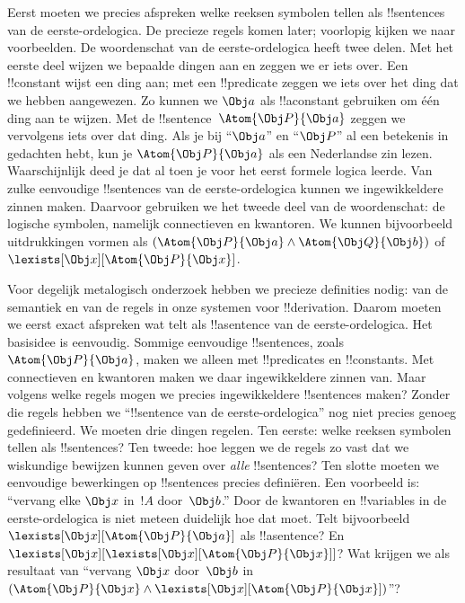 \documentclass[../../../include/open-logic-section]{subfiles}
\begin{document}


Eerst moeten we precies afspreken welke reeksen symbolen tellen als
!!{sentence}s van de eerste-ordelogica. De precieze regels komen later;
voorlopig kijken we naar voorbeelden. De woordenschat van de
eerste-ordelogica heeft twee delen. Met het eerste deel wijzen we
bepaalde dingen aan en zeggen we er iets over. Een !!{constant} wijst
een ding aan; met een !!{predicate} zeggen we iets over het ding dat
we hebben aangewezen. Zo kunnen we $\Obj a$ als !!a{constant} gebruiken
om één ding aan te wijzen. Met de !!{sentence}~$\Atom{\Obj P}{\Obj a}$
zeggen we vervolgens iets over dat ding. Als je bij ``$\Obj a$'' en
``$\Obj P$'' al een betekenis in gedachten hebt, kun je
$\Atom{\Obj P}{\Obj a}$ als een Nederlandse zin lezen. Waarschijnlijk
deed je dat al toen je voor het eerst formele logica leerde. Van zulke
eenvoudige !!{sentence}s van de eerste-ordelogica kunnen we
ingewikkeldere zinnen maken. Daarvoor gebruiken we het tweede deel van
de woordenschat: de logische symbolen, namelijk connectieven en
kwantoren. We kunnen bijvoorbeeld uitdrukkingen vormen als
$(\Atom{\Obj P}{\Obj a} \land \Atom{\Obj Q}{\Obj b})$
of~$\lexists[\Obj x][\Atom{\Obj P}{\Obj x}]$.

Voor degelijk metalogisch onderzoek hebben we precieze definities
nodig: van de semantiek en van de regels in onze systemen voor
!!{derivation}. Daarom moeten we eerst exact afspreken wat telt als
!!a{sentence} van de eerste-ordelogica. Het basisidee is eenvoudig.
Sommige eenvoudige !!{sentence}s, zoals~$\Atom{\Obj P}{\Obj a}$, maken
we alleen met !!{predicate}s en !!{constant}s. Met connectieven en
kwantoren maken we daar ingewikkeldere zinnen van. Maar volgens welke
regels mogen we precies ingewikkeldere !!{sentence}s maken? Zonder die
regels hebben we ``!!{sentence} van de eerste-ordelogica'' nog niet
precies genoeg gedefinieerd. We moeten drie dingen regelen. Ten eerste:
welke reeksen symbolen tellen als !!{sentence}s? Ten tweede: hoe leggen
we de regels zo vast dat we wiskundige bewijzen kunnen geven over
\emph{alle} !!{sentence}s? Ten slotte moeten we eenvoudige bewerkingen
op !!{sentence}s precies definiëren. Een voorbeeld is: ``vervang elke
$\Obj x$ in~$!A$ door~$\Obj b$.'' Door de kwantoren en !!{variable}s in
de eerste-ordelogica is niet meteen duidelijk hoe dat moet. Telt
bijvoorbeeld $\lexists[\Obj x][\Atom{\Obj P}{\Obj a}]$ als
!!a{sentence}? En
$\lexists[\Obj x][\lexists[\Obj x][\Atom{\Obj P}{\Obj x}]]$? Wat
krijgen we als resultaat van ``vervang $\Obj x$ door~$\Obj b$ in
$(\Atom{\Obj P}{\Obj x} \land \lexists[\Obj x][\Atom{\Obj P}{\Obj
x}])$''?
\end{document}
